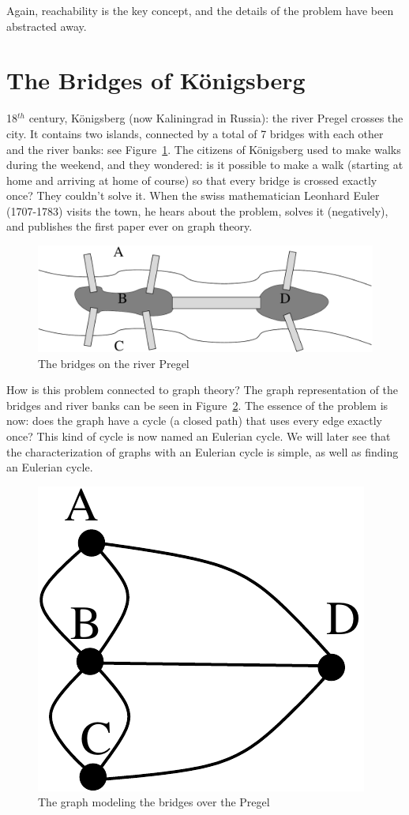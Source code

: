 Again, reachability is the key concept, and the details of the problem
have been abstracted away.


\section{The Bridges of K\"onigsberg}

18$^{th}$ century, K\"onigsberg (now Kaliningrad in Russia): the river Pregel
crosses the city. It contains two islands, connected by a total of 7
bridges with each other and the river banks: see
Figure~\ref{pregel}. The citizens of K\"onigsberg used to make walks
during the weekend, and they wondered: is it possible to make a walk
(starting at home and arriving at home of course) so that every bridge
is crossed exactly once? They couldn't solve it. When the swiss
mathematician Leonhard Euler (1707-1783) visits the town, he hears
about the problem, solves it (negatively), and publishes the first
paper ever on graph theory.

\begin{figure}[ht]
\begin{center}
\includegraphics[width=0.4\linewidth,keepaspectratio]{pregel}
\end{center}
\caption{The bridges on the river Pregel \label{pregel}}
\end{figure}

How is this problem connected to graph theory? The graph
representation of the bridges and river banks can be seen in
Figure~\ref{pregelgraph}. The essence of the problem is now: does the
graph have a cycle (a closed path) that uses every edge exactly once?
This kind of cycle is now named an Eulerian cycle. We will later see
that the characterization of graphs with an Eulerian cycle is simple,
as well as finding an Eulerian cycle.

\begin{figure}[ht]
\begin{center}
\includegraphics[width=0.15\linewidth,keepaspectratio]{pregelgraph}
\end{center}
\caption{The graph modeling the bridges over the Pregel \label{pregelgraph}}
\end{figure}

